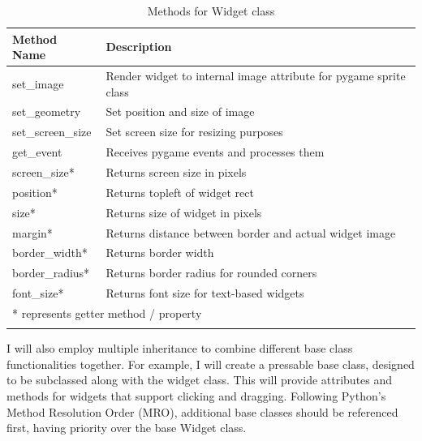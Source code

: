 \documentclass[../main/main.tex]{subfiles}
\begin{document}
\begin{longtable}[c]{l|l}
    \toprule
    \textbf{Method Name} & \textbf{Description}\\
    \midrule
    \endfirsthead
    \endhead

    set\_image & Render widget to internal image attribute for pygame sprite class\\
    set\_geometry & Set position and size of image\\
    set\_screen\_size & Set screen size for resizing purposes\\
    get\_event & Receives pygame events and processes them\\
    screen\_size* & Returns screen size in pixels\\
    position* & Returns topleft of widget rect\\
    size* & Returns size of widget in pixels\\
    margin* & Returns distance between border and actual widget image\\
    border\_width* & Returns border width\\
    border\_radius* & Returns border radius for rounded corners\\
    font\_size* & Returns font size for text-based widgets\\

    \midrule

    \multicolumn{2}{l}{* represents getter method / property}\\

    \bottomrule

\caption{Methods for Widget class}
\label{tab:widget-methods}
\end{longtable}

I will also employ multiple inheritance to combine different base class functionalities together. For example, I will create a pressable base class, designed to be subclassed along with the widget class. This will provide attributes and methods for widgets that support clicking and dragging. Following Python's Method Resolution Order (MRO), additional base classes should be referenced first, having priority over the base Widget class.
\end{document}
